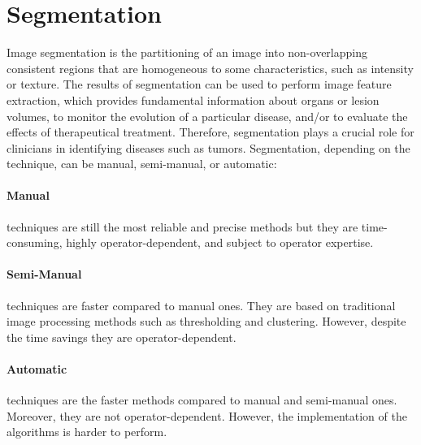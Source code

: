 \documentclass{standalone}
\begin{document}
\section{Segmentation}
Image segmentation is the partitioning of an image into non-overlapping consistent regions that are homogeneous to some characteristics, such as intensity or texture\cite{biondi}.
The results of segmentation can be used to perform image feature extraction, which provides fundamental information about organs or lesion volumes, to monitor the evolution of a particular disease, and/or to evaluate the effects of therapeutical treatment.
Therefore, segmentation plays a crucial role for clinicians in identifying diseases such as tumors.
Segmentation, depending on the technique, can be manual, semi-manual, or automatic:

\paragraph{Manual} techniques are still the most reliable and precise methods but they are time-consuming, highly operator-dependent, and subject to operator expertise\cite{tesicoppola}.

\paragraph{Semi-Manual} techniques are faster compared to manual ones.
They are based on traditional image processing methods such as thresholding and clustering. However, despite the time savings they are operator-dependent\cite{tesicoppola}.

\paragraph{Automatic} techniques are the faster methods compared to manual and semi-manual ones. Moreover, they are not operator-dependent. However, the implementation of the algorithms is harder to perform\cite{tesicoppola}. 
\end{document}
